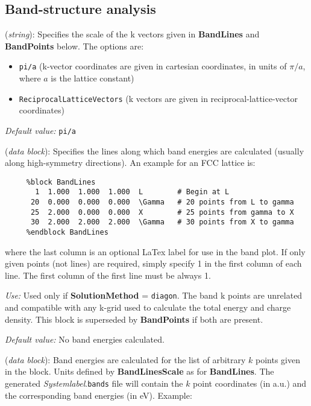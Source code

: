 \documentclass[11pt]{article}
\begin{document}
\subsection{Band-structure analysis}
\begin{description}
\itemsep 10pt
\parsep 0pt

\item[{\bf BandLinesScale}] ({\it string}): 
Specifies the scale of the k vectors given in {\bf BandLines} 
and {\bf BandPoints} below.
The options are:
\begin{itemize}
\item {\tt pi/a} (k-vector coordinates are given in cartesian 
coordinates, in units of $\pi/a$, where $a$ is the lattice constant)
\item {\tt ReciprocalLatticeVectors} (k vectors are given in
reciprocal-lattice-vector coordinates)
\end{itemize}

{\it Default value:} {\tt pi/a}


\item[{\bf BandLines}] ({\it data block}): 
Specifies the lines along which band energies are calculated
(usually along high-symmetry directions).
An example for an FCC lattice is:

\begin{verbatim}
     %block BandLines
       1  1.000  1.000  1.000  L        # Begin at L
      20  0.000  0.000  0.000  \Gamma   # 20 points from L to gamma
      25  2.000  0.000  0.000  X        # 25 points from gamma to X
      30  2.000  2.000  2.000  \Gamma   # 30 points from X to gamma
     %endblock BandLines
\end{verbatim}

where the last column is an optional LaTex label for use in the band plot.
If only given points (not lines) are required, simply specify 1 in the
first column of each line. The first column of the first line must be 
always 1.

{\it Use:} Used only if {\bf SolutionMethod} = {\tt diagon}.
The band k points are unrelated and compatible with any k-grid used
to calculate the total energy and charge density.
This block is superseded by {\bf BandPoints} if both are present.

{\it Default value:} No band energies calculated.

\item[{\bf BandPoints}] ({\it data block}): 
Band energies are calculated for the list of arbitrary $k$ points 
given in the block. Units defined by {\bf BandLinesScale} as 
for {\bf BandLines}. The generated {\it Systemlabel}.{\tt bands} file
will contain the $k$ point coordinates (in a.u.) and the corresponding
band energies (in eV). Example:


\end{description}
\end{document}
